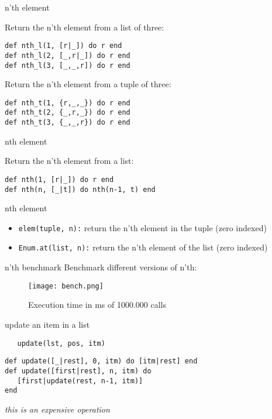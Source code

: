 \begin{frame}[fragile]{n'th element}

Return the n'th element from a list of three:

\pause 
\begin{verbatim}
def nth_l(1, [r|_]) do r end
def nth_l(2, [_,r|_]) do r end
def nth_l(3, [_,_,r]) do r end
\end{verbatim}

\pause Return the n'th element from a tuple of three:
\pause

\begin{verbatim}
def nth_t(1, {r,_,_}) do r end
def nth_t(2, {_,r,_}) do r end
def nth_t(3, {_,_,r}) do r end
\end{verbatim}

\end{frame}

\begin{frame}[fragile]{nth element}

Return the n'th element from a list:

\pause 
\begin{verbatim}
def nth(1, [r|_]) do r end
def nth(n, [_|t]) do nth(n-1, t) end
\end{verbatim}

\end{frame}

\begin{frame}{nth element}

\begin{itemize}
  \item {\tt elem(tuple, n):} return the n'th element in the tuple (zero indexed)
  \item {\tt Enum.at(list, n):} return the n'th element of the list (zero indexed)
\end{itemize}

\end{frame}

\begin{frame}{n'th benchmark}
Benchmark different versions of n'th:
 \begin{figure}
  \centering
  \texttt{[image: bench.png]}
  \caption{Execution time in ms of 1000.000 calls}
 \end{figure}

\end{frame}

\begin{frame}[fragile]{update an item in a list}

\begin{verbatim}
   update(lst, pos, itm)
\end{verbatim}
  \vspace{20pt}\pause
\begin{verbatim}
def update([_|rest], 0, itm) do [itm|rest] end
def update([first|rest], n, itm) do
   [first|update(rest, n-1, itm)]
end
\end{verbatim}

  \vspace{10pt}\pause
  {\em this is an expensive operation}
\end{frame}

